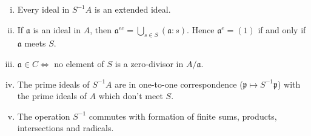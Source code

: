 \begin{proposition}\label{prop:extension-ideals}
\begin{enumerate}[i)]
    \item \label{item 1:prop:extension-ideals}Every ideal in $S^{-1}A$ is an extended ideal.
    \item \label{item 2:prop:extension-ideals}If $\mathfrak{a}$ is an ideal in $A$, then $\mathfrak{a}^{ec} = \bigcup_{s \in S} (\mathfrak{a} : s)$. Hence $\mathfrak{a}^e = (1)$ if and only if $\mathfrak{a}$ meets $S$.
    \item \label{item 3:prop:extension-ideals}$\mathfrak{a} \in C \iff$ no element of $S$ is a zero-divisor in $A/\mathfrak{a}$.
    \item \label{item 4:prop:extension-ideals}The prime ideals of $S^{-1}A$ are in one-to-one correspondence ($\mathfrak{p} \mapsto S^{-1}\mathfrak{p}$) with the prime ideals of $A$ which don't meet $S$.
    \item \label{item 5:prop:extension-ideals}The operation $S^{-1}$ commutes with formation of finite sums, products, intersections and radicals.
\end{enumerate}
\end{proposition}

